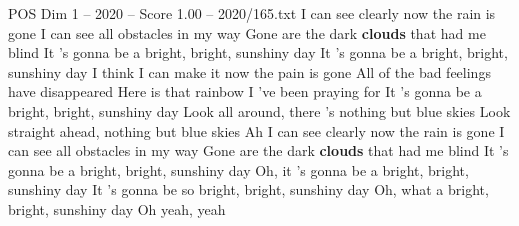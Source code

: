 \begin{textsample}{POS Dim 1 – 2020 – Score 1.00 – 2020/165.txt}  \label{ex:f1_pos_009}
I can see clearly now the rain is gone I can see all obstacles in my way Gone are the dark \textbf{clouds} that had me blind It 's gonna be a bright, bright, sunshiny day It 's gonna be a bright, bright, sunshiny day I think I can make it now the pain is gone All of the bad feelings have disappeared Here is that rainbow I 've been praying for It 's gonna be a bright, bright, sunshiny day Look all around, there 's nothing but blue skies Look straight ahead, nothing but blue skies Ah I can see clearly now the rain is gone I can see all obstacles in my way Gone are the dark \textbf{clouds} that had me blind It 's gonna be a bright, bright, sunshiny day Oh, it 's gonna be a bright, bright, sunshiny day It 's gonna be so bright, bright, sunshiny day Oh, what a bright, bright, sunshiny day Oh yeah, yeah

\end{textsample}
